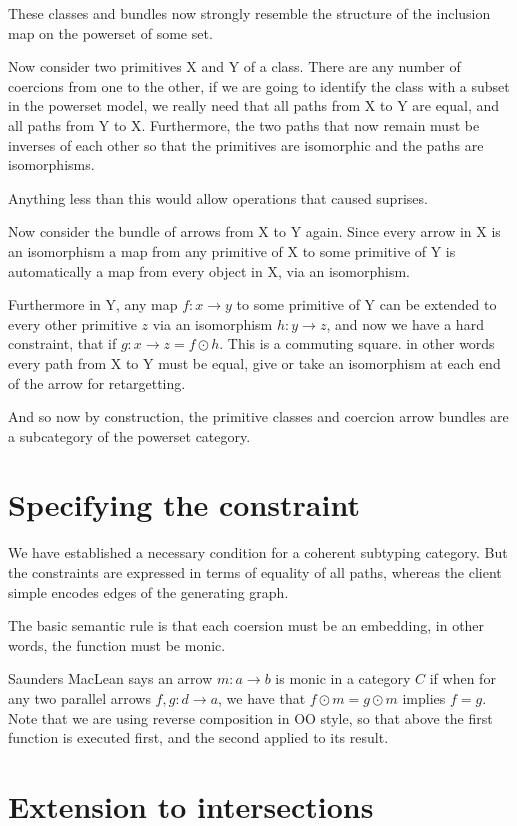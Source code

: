 \documentclass[oneside]{book}
\begin{document}
These classes and bundles now strongly resemble the structure of the
inclusion map on the powerset of some set.

Now consider two primitives X and Y of a class. There are any number
of coercions from one to the other, if we are going to identify the class
with a subset in the powerset model, we really need that all paths
from X to Y are equal, and all paths from Y to X. Furthermore,
the two paths that now remain must be inverses of each other so that
the primitives are isomorphic and the paths are isomorphisms.

Anything less than this would allow operations that caused suprises.

Now consider the bundle of arrows from X to Y again. Since every arrow
in X is an isomorphism a map from any primitive of X to some primitive
of Y is automatically a map from every object in X, via an isomorphism.

Furthermore in Y, any map $f:x\rightarrow y$ to some primitive of Y can be extended
to every other primitive $z$ via an isomorphism $h:y\rightarrow z$, and now we have a hard
constraint, that if $g:x\rightarrow z = f \odot h$. This is a commuting square. 
in other words every path from X to Y must be equal, give or take an isomorphism
at each end of the arrow for retargetting.

And so now by construction, the primitive classes and coercion arrow bundles
are a subcategory of the powerset category.

\section{Specifying the constraint}
We have established a necessary condition for a coherent subtyping
category. But the constraints are expressed in terms of equality
of all paths, whereas the client simple encodes edges of the generating
graph.

The basic semantic rule is that each coersion must be an embedding,
in other words, the function must be monic.

Saunders MacLean says an arrow $m: a\rightarrow b$  is monic in a category $C$
if when for any two parallel arrows $f,g: d\rightarrow a$, we have that $f\odot m = g\odot m$
implies $f=g$. Note that we are using reverse composition in OO style, so that above the first 
function is executed first, and the second applied to its result.

\section{Extension to intersections}
\end{document}
